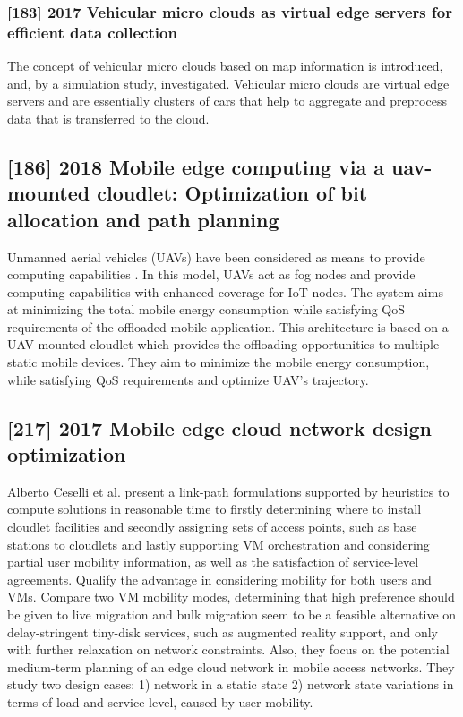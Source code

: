 \subsubsection{[183] 2017 Vehicular micro clouds as virtual edge servers for efficient data collection}
The concept of vehicular micro clouds based on map information is introduced, and, by a simulation study, investigated. Vehicular micro clouds are virtual edge servers and are essentially clusters of cars that help to aggregate and preprocess data that is transferred to the cloud.

\subsection{[186] 2018 Mobile edge computing via a uav-mounted cloudlet: Optimization of bit allocation and path planning}
\label{subsec:paper06}
Unmanned aerial vehicles (UAVs) have been considered as means to provide computing capabilities \cite{jeong2018mobile}. In this model, UAVs act as fog nodes and provide computing capabilities with enhanced coverage for IoT nodes. The system aims at minimizing the total mobile energy consumption while satisfying QoS requirements of the offloaded mobile application. This architecture is based on a UAV-mounted cloudlet which provides the offloading opportunities to multiple static mobile devices. They aim to minimize the mobile energy consumption, while satisfying QoS requirements and optimize UAV’s trajectory.

\subsection{[217] 2017 Mobile edge cloud network design optimization}
\label{subsec:paper08}
Alberto Ceselli et al. \cite{ceselli2017mobile} present a link-path formulations supported by heuristics to compute solutions in reasonable time to firstly determining where to install cloudlet facilities and secondly assigning sets of access points, such as base stations to cloudlets and lastly supporting VM orchestration and considering partial user mobility information, as well as the satisfaction of service-level agreements. Qualify the advantage in considering mobility for both users and VMs. Compare two VM mobility modes, determining that high preference should be given to live migration and bulk migration seem to be a feasible alternative on delay-stringent tiny-disk services, such as augmented reality support, and only with further relaxation on network constraints. Also, they focus on the potential medium-term planning of an edge cloud network in mobile access networks. They study two design cases: 1) network in a static state 2) network state variations in terms of load and service level, caused by user mobility.

